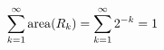 \documentclass[preview]{standalone}
\begin{document}
\begin{align*}
\special{dvisvgm:raw <g id='unique000'>}\sum_{k=1}^\infty\operatorname{area}(R_k)=\sum_{k=1}^\infty2^{-k}=1\special{dvisvgm:raw </g>}
\end{align*}
\end{document}
